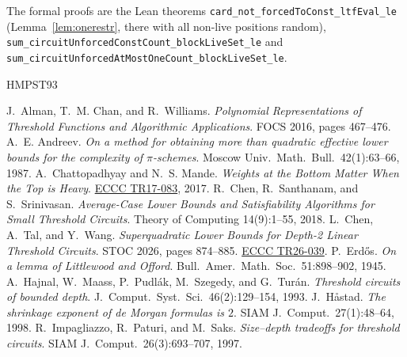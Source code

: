 \documentclass[11pt,letterpaper]{article}
\theoremstyle{remark}
\begin{document}
The formal proofs are the Lean theorems
\texttt{card\_not\_forcedToConst\_ltfEval\_le} (Lemma~\ref{lem:onerestr}, there
with all non-live positions random),
\texttt{sum\_circuitUnforcedConstCount\_blockLiveSet\_le} and
\texttt{sum\_circuitUnforcedAtMostOneCount\_blockLiveSet\_le}.

\renewcommand{\refname}{\texorpdfstring{\color{ink}References}{References}}
\begin{thebibliography}{HMPST93}\setlength{\itemsep}{0pt}\footnotesize

 J.~Alman, T.~M. Chan, and R.~Williams.
\emph{Polynomial Representations of Threshold Functions and Algorithmic
Applications}. FOCS 2016, pages 467--476.
 A.~E. Andreev. \emph{On a method for obtaining more
than quadratic effective lower bounds for the complexity of $\pi$-schemes}.
Moscow Univ.\ Math.\ Bull.\ 42(1):63--66, 1987.
 A.~Chattopadhyay and N.~S. Mande.
\emph{Weights at the Bottom Matter When the Top is Heavy}.
\href{https://eccc.weizmann.ac.il/report/2017/083/}{ECCC TR17-083}, 2017.
 R.~Chen, R.~Santhanam, and S.~Srinivasan.
\emph{Average-Case Lower Bounds and Satisfiability Algorithms for Small
Threshold Circuits}. Theory of Computing 14(9):1--55, 2018.
 L.~Chen, A.~Tal, and Y.~Wang.
\emph{Superquadratic Lower Bounds for Depth-2 Linear Threshold Circuits}.
STOC 2026, pages 874--885. \href{https://eccc.weizmann.ac.il/report/2026/039/}{ECCC TR26-039}.
 P.~Erd\H{o}s. \emph{On a lemma of Littlewood and Offord}.
Bull.\ Amer.\ Math.\ Soc.\ 51:898--902, 1945.
 A.~Hajnal, W.~Maass, P.~Pudl\'ak, M.~Szegedy, and
G.~Tur\'an. \emph{Threshold circuits of bounded depth}. J.\ Comput.\ Syst.\
Sci.\ 46(2):129--154, 1993.
 J.~H{\aa}stad. \emph{The shrinkage exponent of
de Morgan formulas is $2$}. SIAM J.\ Comput.\ 27(1):48--64, 1998.
\bibitem[IPS97]{IPS} R.~Impagliazzo, R.~Paturi, and M.~Saks. \emph{Size--depth tradeoffs for threshold circuits}. SIAM J.\ Comput.\ 26(3):693--707, 1997.


\end{thebibliography}
\end{document}

